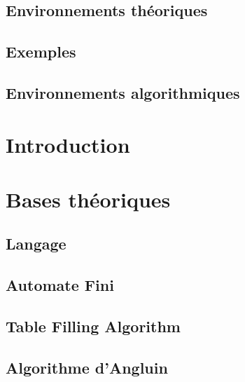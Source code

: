 

\newcommand{\student}{Benjamin André}
\newcommand{\grade}{MAB2 Sciences Informatiques}
\newcommand{\director}{Véronique Bruyère}
\renewcommand{\title}{Apprentissage actif d'automates}
\renewcommand{\date}{\today}



	

	\tableofcontents
	\newpage

	\section*{Environnements théoriques}

	\section*{Exemples}

	\section*{Environnements algorithmiques}

	\newpage

	\chapter{Introduction}\label{ch:intro}

	\chapter{Bases théoriques}\label{ch:bases}
	\section{Langage}\label{sec:langage}
	\section{Automate Fini}\label{sec:automaton}
	\section{Table Filling Algorithm}\label{sec:tfa}
	\section{Algorithme d'Angluin}\label{sec:angluin}


